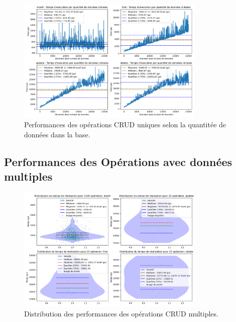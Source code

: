 \documentclass[12pt,a4paper]{report}
\begin{document}
        \begin{figure}[H]
            \centering
            \includegraphics[width=0.8\textwidth]{../plots/MySQL/sharding/test_one_various_data.png}
            \caption{Performances des opérations CRUD uniques selon la quantitée de données dans la base.}
            \label{fig:mysql_cluster_one_various}
        \end{figure}

    \subsection{Performances des Opérations avec données multiples}

        \begin{figure}[H]
            \centering
            \includegraphics[width=0.8\textwidth]{../plots/MySQL/sharding/global_test_many.png}
            \caption{Distribution des performances des opérations CRUD multiples.}
            \label{fig:mysql_cluster_global_many}
        \end{figure}
\end{document}
